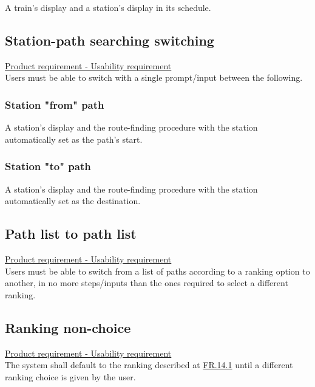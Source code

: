 \documentclass[12pt]{article}
\newcommand\un[1]{\underline{#1}}
\newcommand\hyl[1]{\hyperref[#1]{#1}}
\newcommand\subs[2]{\subsection{#1}\label{#2}}
\newcommand\ssubs[2]{\subsubsection{#1}\label{#2}}
\begin{document}
\noindent A train's display and a station's display in its 
schedule.

\subs{Station-path searching switching}{NFR.11}
\un{Product requirement - Usability requirement} \\
Users must be able to switch with a single prompt/input between the following.

\ssubs{Station "from" path}{NFR.11.1}

\noindent A station's display and the route-finding 
procedure with the station automatically set as the path's start.

\ssubs{Station "to" path}{NFR.11.2}

\noindent A station's display and the route-finding 
procedure with the station automatically set as the destination.

\subs{Path list to path list}{NFR.12}
\un{Product requirement - Usability requirement} \\

\noindent Users must be able to switch from a list of paths according to a ranking option to another, in no more 
steps/inputs than the ones required to select a different ranking. 

\subs{Ranking non-choice}{NFR.13}
\un{Product requirement - Usability requirement} \\

\noindent The system shall default to the ranking described at \hyl{FR.14.1} until a different ranking choice is given by the user.
\end{document}
